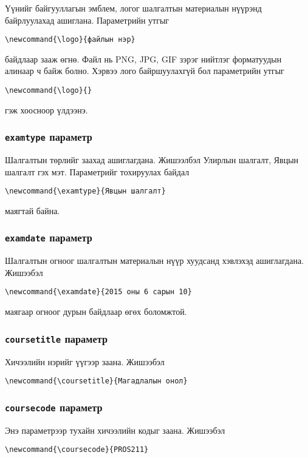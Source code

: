 \documentclass[10pt]{article}
\theoremstyle{definition}
\begin{document}
Үүнийг байгууллагын эмблем, логог шалгалтын материалын нүүрэнд  байрлуулахад ашиглана. Параметрийн утгыг 
\begin{verbatim}
\newcommand{\logo}{файлын нэр}
\end{verbatim}
байдлаар зааж өгнө. Файл нь PNG, JPG, GIF зэрэг нийтлэг форматуудын алинаар ч байж болно. Хэрвээ лого байршуулахгүй бол параметрийн утгыг 
\begin{verbatim}
\newcommand{\logo}{}
\end{verbatim}
гэж хоосноор үлдээнэ.

\subsubsection{\texttt{examtype} параметр}

Шалгалтын төрлийг заахад ашиглагдана. Жишээлбэл Улирлын шалгалт, Явцын шалгалт гэх мэт. Параметрийг тохируулах байдал 
\begin{verbatim}
\newcommand{\examtype}{Явцын шалгалт}
\end{verbatim}
маягтай байна.

\subsubsection{\texttt{examdate} параметр}

Шалгалтын огноог шалгалтын материалын нүүр хуудсанд хэвлэхэд ашиглагдана. Жишээбэл 
\begin{verbatim}
\newcommand{\examdate}{2015 оны 6 сарын 10}
\end{verbatim}
маягаар огноог дурын байдлаар өгөх боломжтой.

\subsubsection{\texttt{coursetitle} параметр}

Хичээлийн нэрийг үүгээр заана. Жишээбэл 
\begin{verbatim}
\newcommand{\coursetitle}{Магадлалын онол}
\end{verbatim}

\subsubsection{\texttt{coursecode} параметр}

Энэ параметрээр тухайн хичээлийн кодыг заана. Жишээбэл
\begin{verbatim}
\newcommand{\coursecode}{PROS211}
\end{verbatim}
\end{document}
